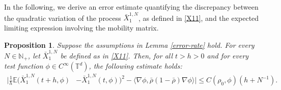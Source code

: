 \documentclass[UTF-8,reqno]{amsart}
\numberwithin{equation}{section}
\newtheorem{proposition}[theorem]{Proposition}
\def\leq{\leqslant}
\def\leq{\leqslant}
\begin{document}
In the following, we derive an error estimate quantifying the discrepancy between the quadratic variation of the process $\bar{X}^{1,N}_1$, as defined in \eqref{X11}, and the expected limiting expression involving the mobility matrix. 

\begin{proposition}\label{error-1}
Suppose the assumptions in Lemma \ref{error-rate} hold. For every $N \in \mathbb{N}_+$, let $\bar{X}^{1,N}_1$ be defined as in \eqref{X11}. Then, for all $t > h > 0$ and for every test function $\phi \in C^{\infty}(\mathbb{T}^d)$, the following estimate holds:
\begin{align}
\Bigg|\frac{1}{h} \mathbb{E}\big(\bar{X}^{1,N}_1(t+h,\phi)& - \bar{X}^{1,N}_1(t,\phi)\big)^2 - \langle \nabla\phi, \bar{\rho}(1 - \bar{\rho}) \nabla\phi \rangle\Bigg|\leq C(\rho_0,\phi)\left(h +N^{-1}\right). 
\end{align}
\end{proposition}
\end{document}
